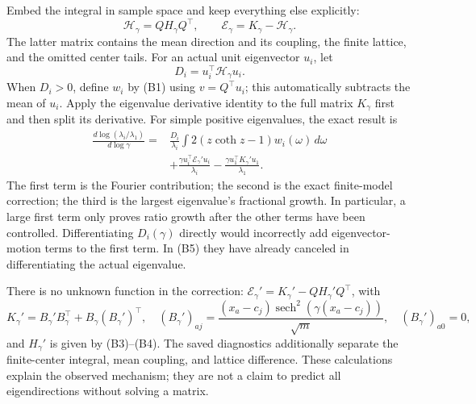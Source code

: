 \documentclass[11pt]{article}
\begin{document}
Embed the integral in sample space and keep everything else explicitly:
\[
\mathcal H_\gamma=QH_\gamma Q^\top,\qquad
\mathcal E_\gamma=K_\gamma-\mathcal H_\gamma.
\]
The latter matrix contains the mean direction and its coupling, the finite lattice, and the omitted center tails. For an actual unit eigenvector \(u_i\), let
\[
D_i=u_i^\top\mathcal H_\gamma u_i.
\]
When \(D_i>0\), define \(w_i\) by (B1) using \(v=Q^\top u_i\); this automatically subtracts the mean of \(u_i\). Apply the eigenvalue derivative identity to the full matrix \(K_\gamma\) first and then split its derivative. For simple positive eigenvalues, the exact result is
\[
\boxed{
\begin{aligned}
\frac{d\log(\lambda_i/\lambda_1)}{d\log\gamma}
={}&\frac{D_i}{\lambda_i}
\int 2(z\coth z-1)w_i(\omega)\,d\omega\\
&+\frac{\gamma u_i^\top\mathcal E_\gamma'u_i}{\lambda_i}
-\frac{\gamma u_1^\top K_\gamma'u_1}{\lambda_1}.
\end{aligned}}
\tag{B5}
\]
The first term is the Fourier contribution; the second is the exact finite-model correction; the third is the largest eigenvalue's fractional growth. In particular, a large first term only proves ratio growth after the other terms have been controlled. Differentiating \(D_i(\gamma)\) directly would incorrectly add eigenvector-motion terms to the first term. In (B5) they have already canceled in differentiating the actual eigenvalue.

There is no unknown function in the correction: \(\mathcal E_\gamma'=K_\gamma'-QH_\gamma'Q^\top\), with
\[
K_\gamma'=B_\gamma'B_\gamma^\top+B_\gamma(B_\gamma')^\top,
\quad (B_\gamma')_{aj}=\frac{(x_a-c_j)\operatorname{sech}^2(\gamma(x_a-c_j))}{\sqrt m},
\quad (B_\gamma')_{a0}=0,
\]
and \(H_\gamma'\) is given by (B3)--(B4). The saved diagnostics additionally separate the finite-center integral, mean coupling, and lattice difference. These calculations explain the observed mechanism; they are not a claim to predict all eigendirections without solving a matrix.
\end{document}
